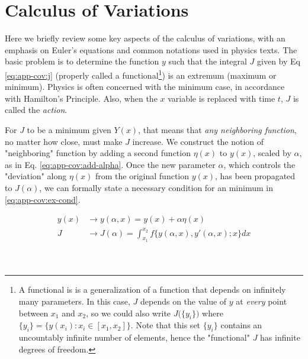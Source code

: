 \newpage
\chapter{Calculus of Variations}
\label{app:calcvar}
Here we briefly review some key aspects of the calculus of variations, with an emphasis on Euler's equations and common notations used in physics texts. The basic problem is to determine the function $y$ such that the integral $J$ given by Eq \ref{eq:app-cov:j} (properly called a functional\footnote{A functional is is a generalization of a function that depends on infinitely many parameters. In this case, $J$ depends on the value of $y$ at \textit{every} point between $x_1$ and $x_2$, so we could also write $J\big(\{y_i\}\big)$ where $\{y_i\}=\{y(x_i):x_i\in[x_1, x_2]\}$. Note that this set $\{y_i\}$ contains an uncountably infinite number of elements, hence the "functional" $J$ has infinite degrees of freedom.}) is an extremum (maximum or minimum). Physics is often concerned with the minimum case, in accordance with Hamilton's Principle. Also, when the $x$ variable is replaced with time $t$, $J$ is called the \textit{action}. 



For $J$ to be a minimum given $Y(x)$, that means that \textit{any neighboring function}, no matter how close, must make $J$ increase. We construct the notion of "neighboring" function by adding a  second function $\eta(x)$ to $y(x)$, scaled by $\alpha$, as in Eq. \ref{eq:app-cov:add-alpha}. Once the new parameter $\alpha$, which controls the "deviation" along $\eta(x)$ from the original function $y(x)$, has been propagated to $J(\alpha)$, we can formally state a necessary condition for an minimum in \ref{eq:app-cov:ex-cond}. 

\begin{equation}
	\label{eq:app-cov:add-alpha}
	\begin{split}
		y(x) & \rightarrow y(\alpha, x) = y(x) + \alpha\eta(x) \\
		J & \rightarrow J(\alpha) = \int_{x_1}^{x_2}f\big\{y(\alpha, x), y'(\alpha, x); x\big\}dx \\
	\end{split}
\end{equation}

\

